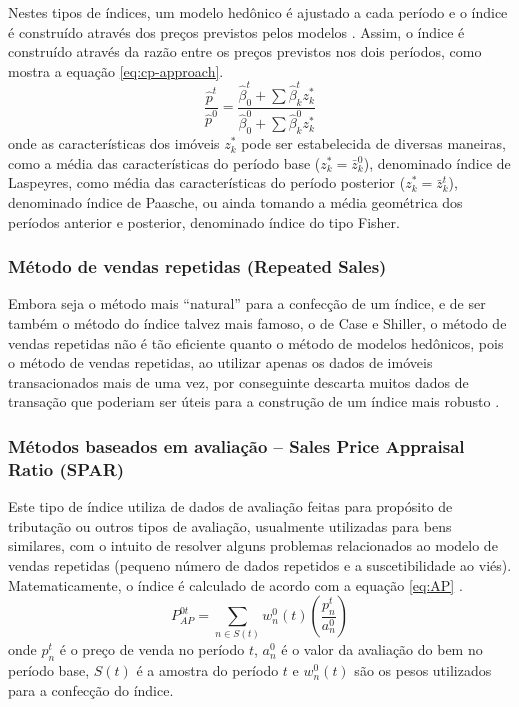 \documentclass[
	12pt,				%
	oneside,			%
	a4paper,			%
	chapter=TITLE,		%
	section=TITLE,		%
	english,			%
	brazil				%
	]{abntex2}
\begin{document}
Nestes tipos de índices, um modelo hedônico é ajustado a cada período e o índice
é construído através dos preços previstos pelos modelos \autocite[53]{rppi}. Assim, o
índice é construído através da razão entre os preços previstos nos dois
períodos, como mostra a equação \eqref{eq:cp-approach}.
\begin{equation}
\frac{\hat p^t}{\hat p^0} = \frac{\hat \beta_0^t + \sum \hat \beta_k^t z_k^*}{\hat \beta_0^0 + \sum \hat \beta_k^0 z_k^*}
\label{eq:cp-approach}
\end{equation}
onde as características dos imóveis \(z_k^*\) pode ser estabelecida de diversas
maneiras, como a média das características do período base (\(z_k^* = \bar z_k^0\)),
denominado índice de Laspeyres, como média das características do período
posterior (\(z_k^* = \bar z_k^t\)), denominado índice de Paasche, ou ainda tomando
a média geométrica dos períodos anterior e posterior, denominado índice do tipo
Fisher.

\hypertarget{muxe9todo-de-vendas-repetidas-repeated-sales}{%
\subsubsection{Método de vendas repetidas (Repeated Sales)}\label{muxe9todo-de-vendas-repetidas-repeated-sales}}

Embora seja o método mais ``natural'' para a confecção de um índice, e de ser
também o método do índice talvez mais famoso, o de Case e Shiller, o método de
vendas repetidas não é tão eficiente quanto o método de modelos hedônicos, pois
o método de vendas repetidas, ao utilizar apenas os dados de imóveis
transacionados mais de uma vez, por conseguinte descarta muitos dados de
transação que poderiam ser úteis para a construção de um índice mais robusto
\autocite[160]{rppi}.

\hypertarget{muxe9todos-baseados-em-avaliauxe7uxe3o-sales-price-appraisal-ratio-spar}{%
\subsubsection{Métodos baseados em avaliação -- Sales Price Appraisal Ratio (SPAR)}\label{muxe9todos-baseados-em-avaliauxe7uxe3o-sales-price-appraisal-ratio-spar}}

Este tipo de índice utiliza de dados de avaliação feitas para propósito de
tributação ou outros tipos de avaliação, usualmente utilizadas para bens
similares, com o intuito de resolver alguns problemas relacionados ao modelo de
vendas repetidas (pequeno número de dados repetidos e a suscetibilidade ao viés).
Matematicamente, o índice é calculado de acordo com a equação \eqref{eq:AP}
\autocite[75]{rppi}.
\begin{equation}
P_{AP}^{0t} = \sum_{n \in S(t)} w_n^0(t) \left ( \frac{p_n^t}{a_n^0} \right )
\label{eq:AP}
\end{equation}
onde \(p_n^t\) é o preço de venda no período \(t\), \(a_n^0\) é o valor da avaliação
do bem no período base, \(S(t)\) é a amostra do período \(t\) e \(w_n^0(t)\) são os
pesos utilizados para a confecção do índice.
\end{document}
